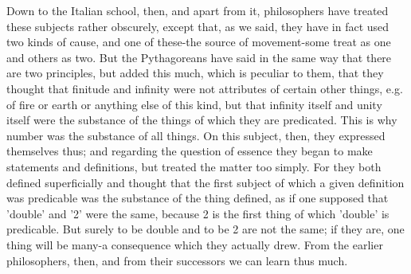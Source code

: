 \documentclass{article}
\begin{document}
Down to the Italian school, then, and apart from it, philosophers have treated these subjects rather obscurely, except that, as we said, they have in fact used two kinds of cause, and one of these-the source of movement-some treat as one and others as two. But the Pythagoreans have said in the same way that there are two principles, but added this much, which is peculiar to them, that they thought that finitude and infinity were not attributes of certain other things, e.g. of fire or earth or anything else of this kind, but that infinity itself and unity itself were the substance of the things of which they are predicated. This is why number was the substance of all things. On this subject, then, they expressed themselves thus; and regarding the question of essence they began to make statements and definitions, but treated the matter too simply. For they both defined superficially and thought that the first subject of which a given definition was predicable was the substance of the thing defined, as if one supposed that 'double' and '2' were the same, because 2 is the first thing of which 'double' is predicable. But surely to be double and to be 2 are not the same; if they are, one thing will be many-a consequence which they actually drew. From the earlier philosophers, then, and from their successors we can learn thus much.
\end{document}
